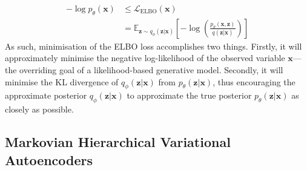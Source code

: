 \documentclass[ oneside,%
                    author={George Herbert},
                    degree={MSci},
                     title={Diffusion Models for Time-Evolving Precipitation Fields},
                  subtitle={}]{dissertation}
\begin{document}
\begin{align}
      -\log p_\theta(\mathbf{x})&\le \mathcal{L}_{\mathrm{ELBO}}(\mathbf{x})\\
      &=\mathbb{E}_{\mathbf{z}\sim q_\phi(\mathbf{z}|\mathbf{x})}\left[-\log\left(\frac{p_\theta(\mathbf{x},\mathbf{z})}{q(\mathbf{z}|\mathbf{x})}\right)\right]
\end{align}
As such, minimisation of the ELBO loss accomplishes two things. Firstly, it will approximately minimise the negative log-likelihood of the observed variable $\mathbf{x}$---the overriding goal of a likelihood-based generative model. Secondly, it will minimise the KL divergence of $q_\phi(\mathbf{z}|\mathbf{x})$ from $p_\theta(\mathbf{z}|\mathbf{x})$, thus encouraging the approximate posterior $q_\phi(\mathbf{z}|\mathbf{x})$ to approximate the true posterior $p_\theta(\mathbf{z}|\mathbf{x})$ as closely as possible. 

\subsection{Markovian Hierarchical Variational Autoencoders}
\label{sec:background_vae_hierarchical}
\end{document}
